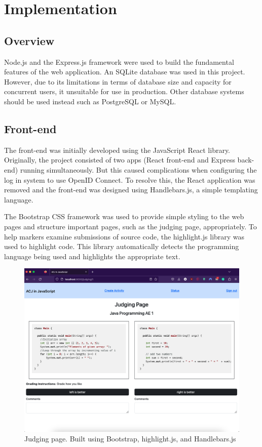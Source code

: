 \documentclass{l4proj}
\begin{document}
\chapter{Implementation}

\section{Overview}

Node.js and the Express.js framework were used to build the fundamental features of the web application. An SQLite database was used in this project. However, due to its limitations in terms of database size and capacity for concurrent users, it unsuitable for use in production\citep{sqlite}. Other database systems should be used instead such as PostgreSQL or MySQL.

\section{Front-end}
The front-end was initially developed using the JavaScript React library. Originally, the project consisted of two apps (React front-end and Express back-end) running simultaneously. But this caused complications when configuring the log in system to use OpenID Connect. To resolve this, the React application was removed and the front-end was designed using Handlebars.js, a simple templating language.

The Bootstrap CSS framework was used to provide simple styling to the web pages and structure important pages, such as the judging page, appropriately. To help markers examine submissions of source code, the highlight.js library was used to highlight code. This library automatically detects the programming language being used and highlights the appropriate text.

\begin{figure}[h]
\begin{center}
    \includegraphics[width=0.80\linewidth]{images/judging.png}    
    \caption{Judging page. Built using Bootstrap, highlight.js, and Handlebars.js}
\end{center}
\end{figure}
\end{document}
